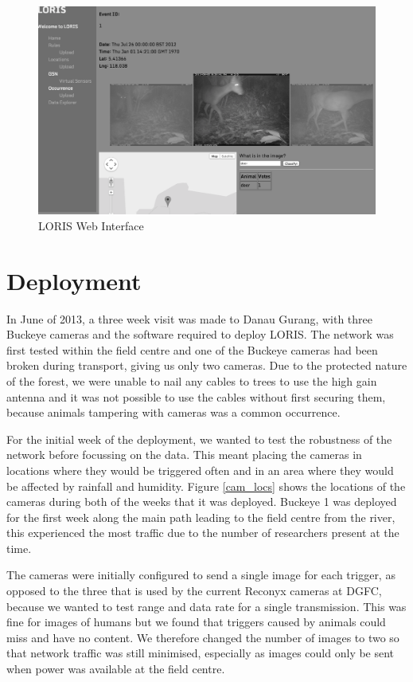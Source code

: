 				\begin{figure}[h]
				\centering
				\includegraphics[width=\textwidth]{Chap6/figures/loris}
				\caption{LORIS Web Interface}
				\label{fig:loris}
				\end{figure}
				
	\section{Deployment}\label{loris:dep}
		In June of 2013, a three week visit was made to Danau Gurang, with three Buckeye cameras and the software required to deploy LORIS. The network was first tested within the field centre and one of the Buckeye cameras had been broken during transport, giving us only two cameras. Due to the protected nature of the forest, we were unable to nail any cables to trees to use the high gain antenna and it was not possible to use the cables without first securing them, because animals tampering with cameras was a common occurrence.
		
		For the initial week of the deployment, we wanted to test the robustness of the network before focussing on the data. This meant placing the cameras in locations where they would be triggered often and in an area where they would be affected by rainfall and humidity. Figure \ref{cam_locs} shows the locations of the cameras during both of the weeks that it was deployed. Buckeye 1 was deployed for the first week along the main path leading to the field centre from the river, this experienced the most traffic due to the number of researchers present at the time. 

		The cameras were initially configured to send a single image for each trigger, as opposed to the three that is used by the current Reconyx cameras at DGFC, because we wanted to test range and data rate for a single transmission. This was fine for images of humans but we found that triggers caused by animals could miss and have no content. We therefore changed the number of images to two so that network traffic was still minimised, especially as images could only be sent when power was available at the field centre.
	

